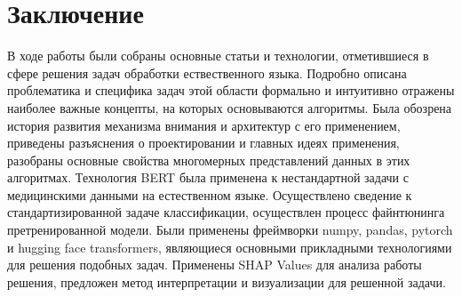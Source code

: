 \section{Заключение}
В ходе работы были собраны основные статьи и технологии, отметившиеся в сфере решения задач обработки ествественного языка. Подробно описана проблематика и специфика задач этой области формально и интуитивно отражены наиболее важные концепты, на которых основываются алгоритмы.
\newline
Была обозрена история развития механизма внимания и архитектур с его применением, приведены разъяснения о проектировании и главных идеях применения, разобраны основные свойства многомерных представлений данных в этих алгоритмах.
\newline
Технология BERT была применена к нестандартной задачи с медицинскими данными на естественном языке. Осуществлено сведение к стандартизированной задаче классификации, осуществлен процесс файнтюнинга претренированной модели.
\newline
Были применены фреймворки numpy, pandas, pytorch и hugging face transformers, являющиеся основными прикладными технологиями для решения подобных задач.
\newline
Применены SHAP Values для анализа работы решения, предложен метод интерпретации и визуализации для решенной задачи.